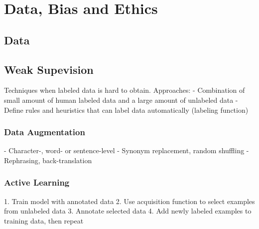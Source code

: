 \documentclass{scrartcl}
\begin{document}
\section*{Data, Bias and Ethics}
\subsection*{Data}
\subsection*{Weak Supevision}
Techniques when labeled data is hard to obtain.
Approaches:
- Combination of small amount of human labeled data and a large amount of unlabeled data
- Define rules and heuristics that can label data automatically (labeling function)

\subsubsection*{Data Augmentation}
- Character-, word- or sentence-level
- Synonym replacement, random shuffling
- Rephrasing, back-translation

\subsubsection*{Active Learning}
1. Train model with annotated data
2. Use acquisition function to select examples from unlabeled data
3. Annotate selected data
4. Add newly labeled examples to training data, then repeat
\end{document}
